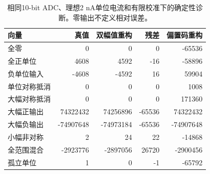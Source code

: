 \begin{table}[htbp]\centering\small
\begin{tabular}{@{}lrrrr@{}}\toprule
向量 & 真值 & 双幅值重构 & 残差 & 偏置码重构\\\midrule
全零 & 0 & 0 & 0 & -65536\\
全正单位 & 4608 & 4592 & -16 & -58896\\
负单位输入 & -4608 & -4592 & 16 & 59904\\
单位对称抵消 & 0 & 0 & 0 & 1008\\
大幅对称抵消 & 0 & 0 & 0 & 171360\\
大幅正输出 & 74322432 & 74256896 & -65536 & 74322432\\
大幅负输出 & -74907648 & -74973184 & -65536 & -74907648\\
小幅非对称 & 2 & 24 & 22 & -14868\\
全范围混合 & -2923776 & -2897056 & 26720 & -2900456\\
孤立单位 & 1 & 0 & -1 & -65792\\
\bottomrule\end{tabular}
\caption{相同10-bit ADC、理想2 nA单位电流和有限校准下的确定性诊断。零输出不定义相对误差。}\end{table}
